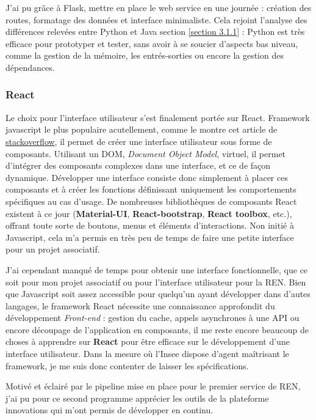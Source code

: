 J'ai pu grâce à Flask, mettre en place le web service en une journée : création des routes, formatage des données et interface minimaliste. Cela rejoint l'analyse des différences relevées entre Python et Java section \ref{section 3.1.1} : Python est très efficace pour prototyper et tester, sans avoir à se soucier d'aspects bas niveau, comme la gestion de la mémoire, les entrés-sorties ou encore la gestion des dépendances.
\label{section 3.2.2 - Flask}

\subsubsection*{React}
Le choix pour l'interface utilisateur s'est finalement portée sur React. Framework javascript le plus populaire acutellement, comme le montre cet article de \href{https://stackoverflow.blog/2018/01/11/brutal-lifecycle-javascript-frameworks/}{stackoverflow}, il permet de créer une interface utilisateur sous forme de composants. Utilisant un DOM, \textit{Document Object Model}, virtuel, il permet d'intégrer des composants complexes dans une interface, et ce de façon dynamique. Développer une interface consiste donc simplement à placer ces composants et à créer les fonctions définissant uniquement les comportements spécifiques au cas d'usage. De nombreuses bibliothèques de composants React existent à ce jour (\textbf{Material-UI}, \textbf{React-bootstrap}, \textbf{React toolbox}, etc.), offrant toute sorte de boutons, menus et éléments d'interactions. Non initié à Javascript, cela m'a permis en très peu de temps de faire une petite interface pour un projet associatif. 
\newline

J'ai cependant manqué de temps pour obtenir une interface fonctionnelle, que ce soit pour mon projet associatif ou pour l'interface utilisateur pour la REN. Bien que Javascript soit assez accessible pour quelqu'un ayant développer dans d'autes langages, le framework React nécessite une connaissance approfondit du développement \textit{Front-end} : gestion du cache, appels asynchrones à une API ou encore découpage de l'application en composants, il me reste encore beaucoup de choses à apprendre sur \textbf{React} pour être efficace sur le développement d'une interface utilisateur. Dans la mesure où l'Insee dispose d'agent maîtrisant le framework, je me suis donc contenter de laisser les spécifications.
\newline

Motivé et éclairé par le pipeline mise en place pour le premier service de REN, j'ai pu pour ce second programme apprécier les outils de la plateforme innovations qui m'ont permis de développer en continu.
\label{section 3.2.2 - React}

